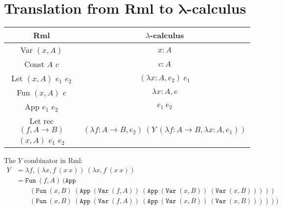 \documentclass[11pt, leqno]{article}
\begin{document}
\section{Translation from Rml to $\mathbf{\lambda}$-calculus}
\begin{center}
  \begin{tabular}{|c|c|}
    \hline
    Rml & $\lambda$-calculus \\ \hline
    Var $(x,A)$ & $x : A$ \\
    Const $A$ $c$ & $c : A$ \\
    Let $(x,A)$ $e_1$ $e_2$ & $(\lambda x : A, e_2)~e_1$ \\
    Fun $(x,A)$ $e$ & $\lambda x : A, e$ \\
    App $e_1$ $e_2$ & $e_1~e_2$ \\
    Let rec $(f,A \rightarrow B)$ $(x,A)$ $e_1$ $e_2$ & $(\lambda f : A \rightarrow B, e_2)~(Y~(\lambda f : A \rightarrow B, \lambda x : A, e_1))$ \\ \hline
  \end{tabular}
\end{center}
The $Y$ combinator in Rml:
\begin{align*}
  Y &= \lambda f, (\lambda x, f~(x~x))~(\lambda x, f~(x~x))\\
    &= \mathtt{Fun}~(f,A)~(\mathtt{App} \\
    & \qquad (\mathtt{Fun}~(x,B)~(\mathtt{App}~(\mathtt{Var}~(f,A))~(\mathtt{App}~(\mathtt{Var}~(x,B))~(\mathtt{Var}~(x,B)))))\\
    & \qquad (\mathtt{Fun}~(x,B)~(\mathtt{App}~(\mathtt{Var}~(f,A))~(\mathtt{App}~(\mathtt{Var}~(x,B))~(\mathtt{Var}~(x,B))))))
\end{align*}
\end{document}
